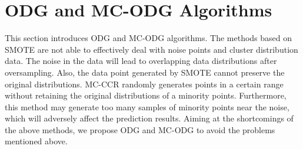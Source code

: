 \documentclass[ida]{iosart2x}
\begin{document}
\section{ODG and MC-ODG Algorithms}
This section introduces ODG and MC-ODG algorithms.
The methods based on SMOTE are not able to effectively deal with noise points and cluster distribution data.
The noise in the data will lead to overlapping data distributions after oversampling.
Also, the data point generated by SMOTE cannot preserve the original distributions.
MC-CCR randomly generates points in a certain range without retaining the original distributions of a minority points.
Furthermore, this method may generate too many samples of 
minority points near the noise, which will adversely affect the prediction results.
Aiming at the shortcomings of the above methods, 
we propose ODG and MC-ODG to avoid the problems mentioned above.
\end{document}
